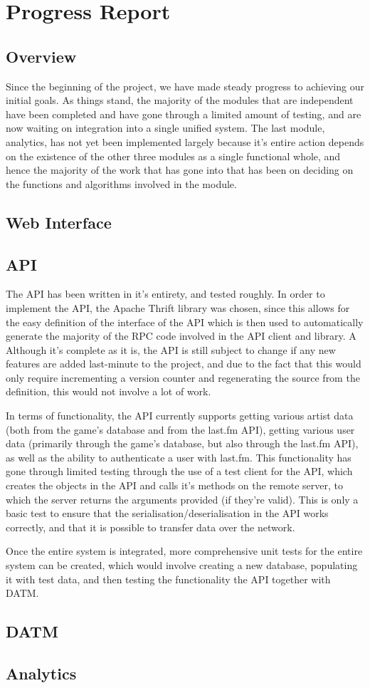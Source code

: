 \documentclass[a4paper,10pt,twoside]{article}
\begin{document}
\section{Progress Report}
\subsection{Overview}

Since the beginning of the project, we have made steady progress to achieving our initial goals. As things stand, the majority of the modules that are independent have been completed and have gone through a limited amount of testing, and are now waiting on integration into a single unified system. The last module, analytics, has not yet been implemented largely because it's entire action depends on the existence of the other three modules as a single functional whole, and hence the majority of the work that has gone into that has been on deciding on the functions and algorithms involved in the module.

\subsection{Web Interface}
\subsection{API}

The API has been written in it's entirety, and tested roughly. In order to implement the API, the Apache Thrift library was chosen, since this allows for the easy definition of the interface of the API which is then used to automatically generate the majority of the RPC code involved in the API client and library. A Although it's complete as it is, the API is still subject to change if any new features are added last-minute to the project, and due to the fact that this would only require incrementing a version counter and regenerating the source from the definition, this would not involve a lot of work.

In terms of functionality, the API currently supports getting various artist data (both from the game's database and from the last.fm API), getting various user data (primarily through the game's database, but also through the last.fm API), as well as the ability to authenticate a user with last.fm. This functionality has gone through limited testing through the use of a test client for the API, which creates the objects in the API and calls it's methods on the remote server, to which the server returns the arguments provided (if they're valid). This is only a basic test to ensure that the serialisation/deserialisation in the API works correctly, and that it is possible to transfer data over the network.

Once the entire system is integrated, more comprehensive unit tests for the entire system can be created, which would involve creating a new database, populating it with test data, and then testing the functionality the API together with DATM. 

\subsection{DATM}
\subsection{Analytics}
\end{document}
